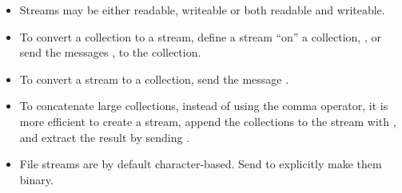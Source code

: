 \documentclass[a4paper,10pt,twoside]{book}
\begin{document}
\begin{itemize}
  \item Streams may be either readable, writeable or both readable and writeable.
  \item To convert a collection to a stream, define a stream ``on'' a collection, \eg {}, or send the messages , \etc to the collection.
  \item To convert a stream to a collection, send the message .
  \item To concatenate large collections, instead of using the comma operator, it is more efficient to create a stream, append the collections to the stream with , and extract the result by sending .
  \item File streams are by default character-based. Send  to explicitly make them binary.
\end{itemize}

\ifx\wholebook\relax\else
\end{document}
